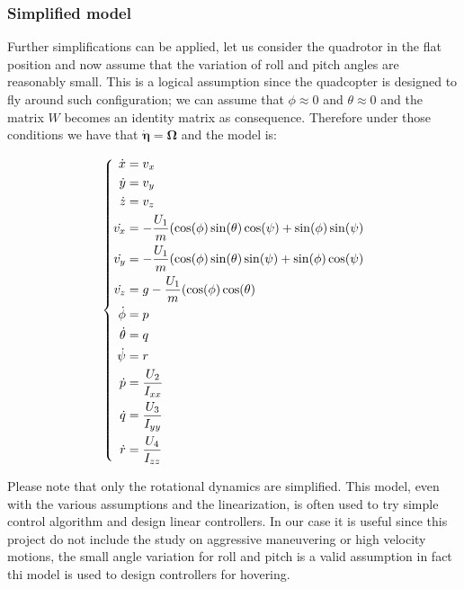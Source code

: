\subsubsection*{Simplified model}
Further simplifications can be applied, let us consider the quadrotor in the flat position and now assume that the variation of roll and pitch angles are reasonably small. This is a logical assumption since the quadcopter is designed to fly around such configuration; we can assume that $\phi \approx 0$ and $\theta \approx 0$ and the matrix $W$ becomes an identity matrix as consequence. Therefore under those conditions we have that $\boldsymbol{\dot{\eta}} = \boldsymbol{\Omega}$ and the model is:

\vspace{2ex}
\begin{equation}
\vspace{2ex}
\left\lbrace
	\begin{aligned}
		\dot{x}& = v_x \\
		\dot{y}& = v_y \\
		\dot{z}& = v_z \\
		\dot{v_x}& = -\frac{U_1}{m}(\cos(\phi)\sin(\theta)\cos(\psi) + \sin(\phi)\sin(\psi) \\
		\dot{v_y}& = -\frac{U_1}{m}(\cos(\phi)\sin(\theta)\sin(\psi) + \sin(\phi)\cos(\psi) \\
		\dot{v_z}& = g - \frac{U_1}{m}(\cos(\phi)\cos(\theta) \\
        \dot{\phi}& = p \\
        \dot{\theta}& = q  \\
        \dot{\psi}& = r \\
        \dot{p}& =\frac{U_2}{I_{xx}} \\
        \dot{q}& =\frac{U_3}{I_{yy}} \\
        \dot{r}& =\frac{U_4}{I_{zz}} \\
     \end{aligned}
     \right.
\label{eq:mathlinlmodel}
\end{equation}

\noindent
Please note that only the rotational dynamics are simplified. This model, even with the various assumptions and the linearization, is often used to try simple control algorithm and design linear controllers. In our case it is useful since this project do not include the study on aggressive maneuvering or high velocity motions, the small angle variation for roll and pitch is a valid assumption in fact thi model is used to design controllers for hovering. 

